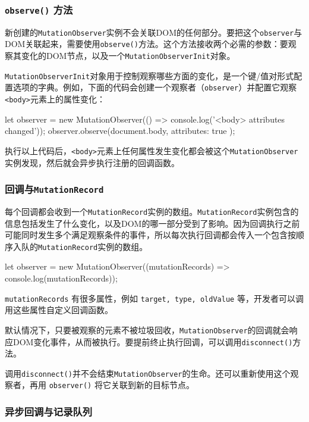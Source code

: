 \subsubsection*{\texttt{observe()} 方法}

新创建的\texttt{MutationObserver}实例不会关联DOM的任何部分。要把这个\texttt{observer}与DOM关联起来，需要使用\texttt{observe()}方法。这个方法接收两个必需的参数：要观察其变化的DOM节点，以及一个\texttt{MutationObserverInit}对象。

\texttt{MutationObserverInit}对象用于控制观察哪些方面的变化，是一个键/值对形式配置选项的字典。例如，下面的代码会创建一个观察者（\texttt{observer}）并配置它观察\texttt{<body>}元素上的属性变化：

\begin{JavaScript}
let observer = new MutationObserver(() => console.log('<body> attributes changed')); 
observer.observe(document.body, { attributes: true }); 
\end{JavaScript}

执行以上代码后，\texttt{<body>}元素上任何属性发生变化都会被这个\texttt{MutationObserver}实例发现，然后就会异步执行注册的回调函数。

\subsubsection*{回调与\texttt{MutationRecord}}

每个回调都会收到一个\texttt{MutationRecord}实例的数组。\texttt{MutationRecord}实例包含的信息包括发生了什么变化，以及DOM的哪一部分受到了影响。因为回调执行之前可能同时发生多个满足观察条件的事件，所以每次执行回调都会传入一个包含按顺序入队的\texttt{MutationRecord}实例的数组。

\begin{JavaScript}
let observer = new MutationObserver((mutationRecords) => console.log(mutationRecords));
\end{JavaScript}

\texttt{mutationRecords} 有很多属性，例如 \texttt{target, type, oldValue} 等，开发者可以调用这些属性自定义回调函数。

默认情况下，只要被观察的元素不被垃圾回收，\texttt{MutationObserver}的回调就会响应DOM变化事件，从而被执行。要提前终止执行回调，可以调用\texttt{disconnect()}方法。

调用\texttt{disconnect()}并不会结束\texttt{MutationObserver}的生命。还可以重新使用这个观察者，再用 \texttt{observer()} 将它关联到新的目标节点。

\subsubsection*{异步回调与记录队列}

